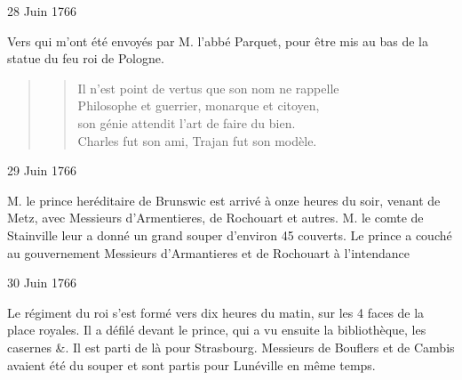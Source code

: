                      \begin{diary}{28 Juin 1766}{}
                        
                         Vers qui m'ont été envoyés par
                              M.
                              l'abbé Parquet, pour être mis au bas
                           de la statue du feu roi de
                           Pologne.
                        \bigskip
        
        
                        \begin{quote}\begin{verse}Il n'est point de vertus que son nom ne rappelle\\Philosophe et guerrier, monarque et citoyen,\\son génie attendit l'art de faire du bien.\\Charles fut son ami, Trajan fut son modèle.\\\end{verse}
        \bigskip
        
        \end{quote}
                     \end{diary}
                     \begin{diary}{29 Juin 1766}{}
                        
                        
                           M. le prince heréditaire de
                              Brunswic est
                           arrivé à onze heures du soir, venant de Metz,
                           avec Messieurs
                           d'Armentieres, de Rochouart et
                           autres. M. le comte de
                              Stainville leur a
                           donné un grand souper d'environ 45 couverts.
                           Le prince a couché au gouvernement
                           Messieurs
                           d'Armantieres et de Rochouart à l'intendance
                        \bigskip
        
        
                     \end{diary}

                     \begin{diary}{30 Juin 1766}{}
                        
                        
                           Le régiment du roi s'est formé vers dix heures
                           du matin, sur les 4 faces de la
                              place royales.
                           Il a défilé devant le
                              prince, qui a vu ensuite
                           la bibliothèque, les
                              casernes &. Il est parti de là
                           pour Strasbourg. Messieurs
                           de Bouflers et de Cambis
                           avaient été du souper et sont partis pour
                           Lunéville en même temps. \bigskip
        
        
                     \end{diary}
